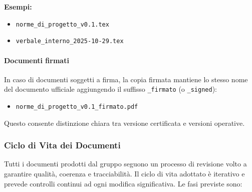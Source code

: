 \documentclass[a4paper, 11pt, oneside]{scrartcl} %
\begin{document}
\noindent
\textbf{Esempi:}
\begin{itemize}
    \item \texttt{norme\_di\_progetto\_v0.1.tex}
    \item \texttt{verbale\_interno\_2025-10-29.tex}
\end{itemize}

\paragraph{Documenti firmati}
In caso di documenti soggetti a firma, la copia firmata mantiene lo stesso nome del documento ufficiale aggiungendo il suffisso \texttt{\_firmato} (o \texttt{\_signed}):

\begin{itemize}
    \item \texttt{norme\_di\_progetto\_v0.1\_firmato.pdf}
\end{itemize}

Questo consente distinzione chiara tra versione certificata e versioni operative.
\subsubsection{Ciclo di Vita dei Documenti}

Tutti i documenti prodotti dal gruppo seguono un processo di revisione volto a garantire qualità, coerenza e tracciabilità.
Il ciclo di vita adottato è iterativo e prevede controlli continui ad ogni modifica significativa.
Le fasi previste sono:
\end{document}
